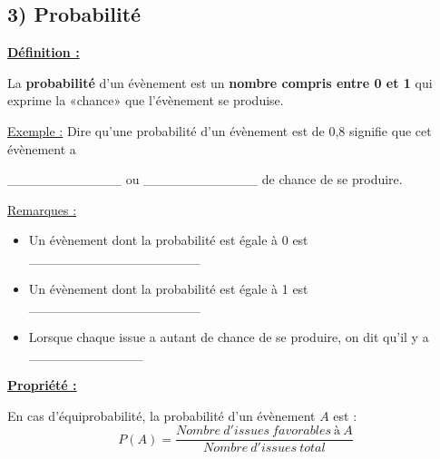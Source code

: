 \documentclass[12pt]{article}
\begin{document}
\vspace{10pt}
\subsection*{\hspace{1cm} 3) Probabilité}

\vspace{5pt}
\begin{mdframed}[
    linewidth=1pt,
    roundcorner=5pt,
    linecolor=ForestGreen,
    innertopmargin=10pt,
    innerbottommargin=10pt
]
{\color{ForestGreen}
\textbf{\underline{Définition :}}}

\vspace{5pt}
La \textbf{probabilité} d'un évènement est un \textbf{nombre compris entre 0 et 1} qui exprime la «chance» 
que l'évènement se produise.

\end{mdframed}

\vspace{5pt}
\underline{Exemple :} Dire qu'une probabilité d'un évènement est de 0,8 signifie que cet évènement a 

\vspace{20pt}
\_\_\_\_\_\_\_\_\_\_\_\_ ou \_\_\_\_\_\_\_\_\_\_\_\_ de chance de se produire.

\vspace{5pt}
\underline{Remarques :}

\begin{itemize}
    \item Un évènement dont la probabilité est égale à 0 est \_\_\_\_\_\_\_\_\_\_\_\_\_\_\_\_\_\_

    \vspace{20pt}
    \item Un évènement dont la probabilité est égale à 1 est \_\_\_\_\_\_\_\_\_\_\_\_\_\_\_\_\_\_

    \vspace{20pt}
    \item Lorsque chaque issue a autant de chance de se produire, on dit qu'il y a \_\_\_\_\_\_\_\_\_\_\_\_
\end{itemize}

\vspace{5pt}
\begin{mdframed}[
    linewidth=1pt,
    roundcorner=5pt,
    linecolor=Red,
    innertopmargin=10pt,
    innerbottommargin=0pt
]
{\color{red}
\textbf{\underline{Propriété :}}

\vspace{5pt}
En cas d'équiprobabilité, la probabilité d'un évènement $A$ est : 
\[
P(A) = \dfrac{Nombre\ d'issues\ favorables\ à\ A}{Nombre\ d'issues\ total}
\]
}
\end{mdframed}
\end{document}
